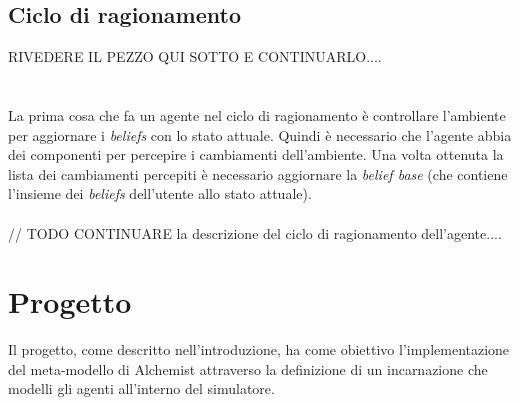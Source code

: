 \documentclass[12pt,a4paper,openright,twoside]{report}
\begin{document}
\section{Ciclo di ragionamento}
RIVEDERE IL PEZZO QUI SOTTO E CONTINUARLO....
\\
\\
\\
La prima cosa che fa un agente nel ciclo di ragionamento \`e controllare l'ambiente per aggiornare i \textit{beliefs} con lo stato attuale. Quindi \`e necessario che l'agente abbia dei componenti per percepire i cambiamenti dell'ambiente. Una volta ottenuta la lista dei cambiamenti percepiti \`e necessario aggiornare la \textit{belief base} (che contiene l'insieme dei \textit{beliefs} dell'utente allo stato attuale).
\\
\\
// TODO CONTINUARE la descrizione del ciclo di ragionamento dell'agente....
%
%
%


\chapter{Progetto}
\lhead[\fancyplain{}{\bfseries\thepage}]{\fancyplain{}{\bfseries\rightmark}}
Il progetto, come descritto nell'introduzione, ha come obiettivo l'implementazione del meta-modello di Alchemist attraverso la definizione di un incarnazione che modelli gli agenti all'interno del simulatore.
\end{document}
